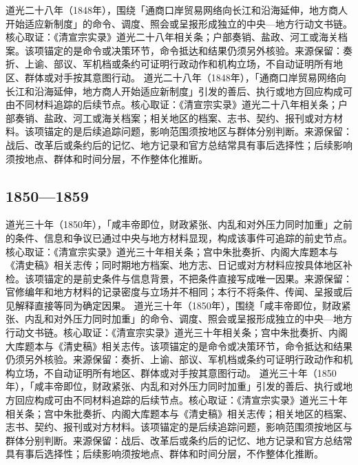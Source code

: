 道光二十八年（1848年），围绕「通商口岸贸易网络向长江和沿海延伸，地方商人开始适应新制度」的命令、调度、照会或呈报形成独立的中央—地方行动文书链。核心取证：《清宣宗实录》道光二十八年相关条；户部奏销、盐政、河工或海关档案。该项锚定的是命令或决策环节，命令抵达和结果仍须另外核验。来源保留：奏折、上谕、部议、军机档或条约可证明行政动作和机构立场，不自动证明所有地区、群体或对手按其意图行动。
道光二十八年（1848年），「通商口岸贸易网络向长江和沿海延伸，地方商人开始适应新制度」引发的善后、执行或地方回应构成可由不同材料追踪的后续节点。核心取证：《清宣宗实录》道光二十八年相关条；户部奏销、盐政、河工或海关档案；相关地区的档案、志书、契约、报刊或对方材料。该项锚定的是后续追踪问题，影响范围须按地区与群体分别判断。来源保留：战后、改革后或条约后的记忆、地方记录和官方总结常具有事后选择性；后续影响须按地点、群体和时间分层，不作整体化推断。
\subsection{1850—1859}
道光三十年（1850年），「咸丰帝即位，财政紧张、内乱和对外压力同时加重」之前的条件、信息和争议已通过中央与地方材料显现，构成该事件可追踪的前史节点。核心取证：《清宣宗实录》道光三十年相关条；宫中朱批奏折、内阁大库题本与《清史稿》相关志传；同时期地方档案、地方志、日记或对方材料应按具体地区补检。该项锚定的是前史条件与信息背景，不把条件直接写成唯一因果。来源保留：官修编年和地方材料的记录密度与立场并不相同；本行不将条件、传闻、呈报或后见解释直接等同为确定因果。
道光三十年（1850年），围绕「咸丰帝即位，财政紧张、内乱和对外压力同时加重」的命令、调度、照会或呈报形成独立的中央—地方行动文书链。核心取证：《清宣宗实录》道光三十年相关条；宫中朱批奏折、内阁大库题本与《清史稿》相关志传。该项锚定的是命令或决策环节，命令抵达和结果仍须另外核验。来源保留：奏折、上谕、部议、军机档或条约可证明行政动作和机构立场，不自动证明所有地区、群体或对手按其意图行动。
道光三十年（1850年），「咸丰帝即位，财政紧张、内乱和对外压力同时加重」引发的善后、执行或地方回应构成可由不同材料追踪的后续节点。核心取证：《清宣宗实录》道光三十年相关条；宫中朱批奏折、内阁大库题本与《清史稿》相关志传；相关地区的档案、志书、契约、报刊或对方材料。该项锚定的是后续追踪问题，影响范围须按地区与群体分别判断。来源保留：战后、改革后或条约后的记忆、地方记录和官方总结常具有事后选择性；后续影响须按地点、群体和时间分层，不作整体化推断。
